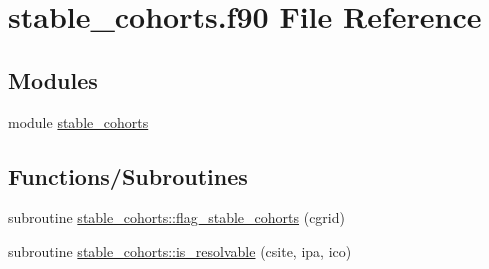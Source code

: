 \hypertarget{stable__cohorts_8f90}{}\section{stable\+\_\+cohorts.\+f90 File Reference}
\label{stable__cohorts_8f90}
\subsection*{Modules}
\begin{DoxyCompactItemize}
\item 
module \hyperlink{namespacestable__cohorts}{stable\+\_\+cohorts}
\end{DoxyCompactItemize}
\subsection*{Functions/\+Subroutines}
\begin{DoxyCompactItemize}
\item 
subroutine \hyperlink{namespacestable__cohorts_a128ce75ff1445cc34c972fdee72fa187}{stable\+\_\+cohorts\+::flag\+\_\+stable\+\_\+cohorts} (cgrid)
\item 
subroutine \hyperlink{namespacestable__cohorts_abeeb04be99f38d90727f82792b2f199a}{stable\+\_\+cohorts\+::is\+\_\+resolvable} (csite, ipa, ico)
\end{DoxyCompactItemize}

